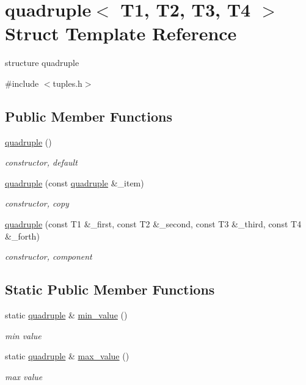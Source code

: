 \hypertarget{structquadruple}{}\section{quadruple$<$ T1, T2, T3, T4 $>$ Struct Template Reference}
\label{structquadruple}


structure quadruple  




{\ttfamily \#include $<$tuples.\+h$>$}

\subsection*{Public Member Functions}
\begin{DoxyCompactItemize}
\item 
\hyperlink{structquadruple_ab4b318f9f20c5f861c0b7445bf806da8}{quadruple} ()
\begin{DoxyCompactList}\small\item\em constructor, default \end{DoxyCompactList}\item 
\hyperlink{structquadruple_a24c753a7c00f8325bf7f738815e89d06}{quadruple} (const \hyperlink{structquadruple}{quadruple} \&\+\_\+item)
\begin{DoxyCompactList}\small\item\em constructor, copy \end{DoxyCompactList}\item 
\hyperlink{structquadruple_a23034a914f2841aa59c833bb3923f1b6}{quadruple} (const T1 \&\+\_\+first, const T2 \&\+\_\+second, const T3 \&\+\_\+third, const T4 \&\+\_\+forth)
\begin{DoxyCompactList}\small\item\em constructor, component \end{DoxyCompactList}\end{DoxyCompactItemize}
\subsection*{Static Public Member Functions}
\begin{DoxyCompactItemize}
\item 
static \hyperlink{structquadruple}{quadruple} \& \hyperlink{structquadruple_a97a2767881ac4cfb52513827b4f51588}{min\+\_\+value} ()
\begin{DoxyCompactList}\small\item\em min value \end{DoxyCompactList}\item 
static \hyperlink{structquadruple}{quadruple} \& \hyperlink{structquadruple_a1361dd9869f7323e5fc33ab07864e128}{max\+\_\+value} ()
\begin{DoxyCompactList}\small\item\em max value \end{DoxyCompactList}\end{DoxyCompactItemize}
